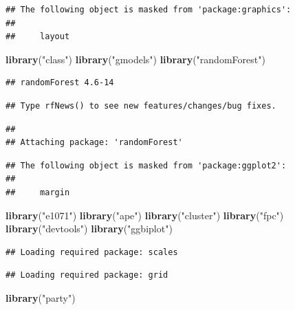 \documentclass[]{article}
\newenvironment{Shaded}{\begin{snugshade}}{\end{snugshade}}
\newcommand{\KeywordTok}[1]{\textcolor[rgb]{0.13,0.29,0.53}{\textbf{#1}}}
\newcommand{\NormalTok}[1]{#1}
\newcommand{\StringTok}[1]{\textcolor[rgb]{0.31,0.60,0.02}{#1}}
\begin{document}
\begin{verbatim}
## The following object is masked from 'package:graphics':
## 
##     layout
\end{verbatim}

\begin{Shaded}
\begin{Highlighting}[]
\KeywordTok{library}\NormalTok{(}\StringTok{"class"}\NormalTok{)}
\KeywordTok{library}\NormalTok{(}\StringTok{"gmodels"}\NormalTok{)}
\KeywordTok{library}\NormalTok{(}\StringTok{"randomForest"}\NormalTok{)}
\end{Highlighting}
\end{Shaded}

\begin{verbatim}
## randomForest 4.6-14
\end{verbatim}

\begin{verbatim}
## Type rfNews() to see new features/changes/bug fixes.
\end{verbatim}

\begin{verbatim}
## 
## Attaching package: 'randomForest'
\end{verbatim}

\begin{verbatim}
## The following object is masked from 'package:ggplot2':
## 
##     margin
\end{verbatim}

\begin{Shaded}
\begin{Highlighting}[]
\KeywordTok{library}\NormalTok{(}\StringTok{"e1071"}\NormalTok{)}
\KeywordTok{library}\NormalTok{(}\StringTok{"ape"}\NormalTok{)}
\KeywordTok{library}\NormalTok{(}\StringTok{"cluster"}\NormalTok{)}
\KeywordTok{library}\NormalTok{(}\StringTok{"fpc"}\NormalTok{)}
\KeywordTok{library}\NormalTok{(}\StringTok{"devtools"}\NormalTok{)}
\KeywordTok{library}\NormalTok{(}\StringTok{"ggbiplot"}\NormalTok{)}
\end{Highlighting}
\end{Shaded}

\begin{verbatim}
## Loading required package: scales
\end{verbatim}

\begin{verbatim}
## Loading required package: grid
\end{verbatim}

\begin{Shaded}
\begin{Highlighting}[]
\KeywordTok{library}\NormalTok{(}\StringTok{"party"}\NormalTok{)}
\end{Highlighting}
\end{Shaded}
\end{document}
